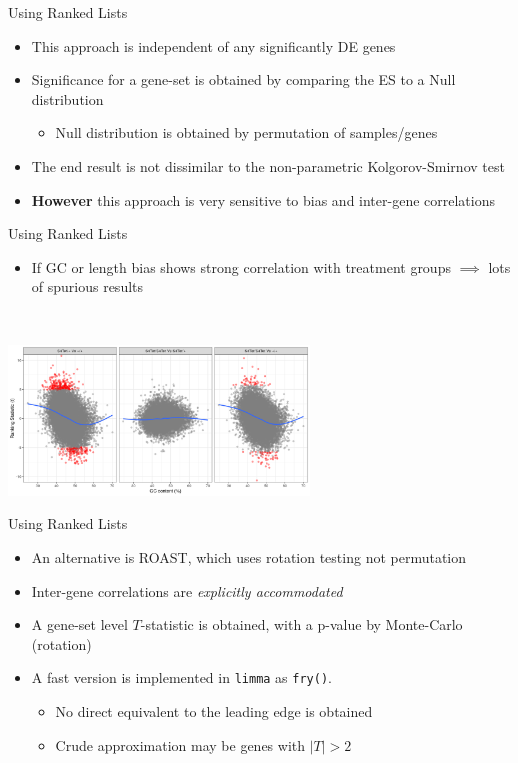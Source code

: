 \documentclass[aspectratio=169,11pt]{beamer}
\begin{document}
\begin{frame}{Using Ranked Lists}

	\begin{itemize}
		\item This approach is independent of any significantly DE genes
		\item Significance for a gene-set is obtained by comparing the ES to a Null distribution
		\begin{itemize}
			\item Null distribution is obtained by permutation of samples/genes
		\end{itemize}
		\item The end result is not dissimilar to the non-parametric Kolgorov-Smirnov test
		\item \textbf{However} this approach is very sensitive to bias and inter-gene correlations
	\end{itemize}

\end{frame}

\begin{frame}{Using Ranked Lists}

	\begin{itemize}
		\item If GC or length bias shows strong correlation with treatment groups $\implies$ lots of spurious results
	\end{itemize}
	~\\[4mm]
	\begin{center}
		\includegraphics[width=0.6\textwidth]{figures/voomGCBias-1.png} 
	\end{center}
	
\end{frame}

\begin{frame}{Using Ranked Lists}

	\begin{itemize}
		\item An alternative is ROAST, which uses rotation testing not permutation
		\item Inter-gene correlations are \textit{explicitly accommodated}
		\item A gene-set level $T$-statistic is obtained, with a p-value by Monte-Carlo (rotation)
		\item A fast version is implemented in \texttt{limma} as \texttt{fry()}.
		\begin{itemize}
			\item No direct equivalent to the leading edge is obtained
			\item Crude approximation may be genes with $|T| > 2$
		\end{itemize}
	\end{itemize}

\end{frame}
\end{document}
